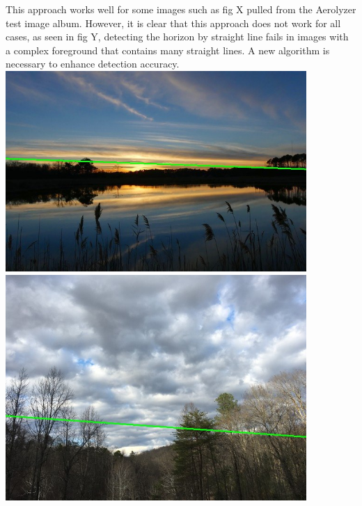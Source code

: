 \documentclass[onecolumn, draftclsnofoot,10pt, compsoc]{IEEEtran}
\begin{document}
\begin{singlespace}
				This approach works well for some images such as fig X pulled from the Aerolyzer test image album.
		However, it is clear that this approach does not work for all cases, as seen in fig Y, detecting the horizon by straight line fails in images with a complex foreground that contains many straight lines.
		A new algorithm is necessary to enhance detection accuracy.
				\\
				\includegraphics[width=4.5in,natwidth=640,natheight=427]{images/line1.jpg}
				\\
 				\includegraphics[width=4.5in,natwidth=640,natheight=480]{images/line2.jpg}


\end{singlespace}
\end{document}
